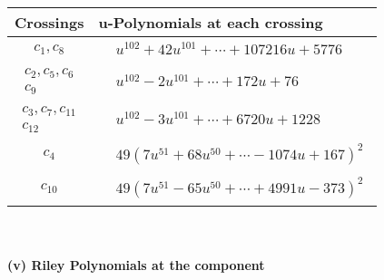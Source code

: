 \documentclass[1p]{elsarticle_modified}
\theoremstyle{definition}
\begin{document}
\begin{tabular}{m{50pt}|m{274pt}}
Crossings & \hspace{64pt}u-Polynomials at each crossing \\
\hline $$\begin{aligned}c_{1},c_{8}\end{aligned}$$&$\begin{aligned}
&u^{102}+42 u^{101}+\cdots+107216 u+5776
\end{aligned}$\\
\hline $$\begin{aligned}c_{2},c_{5},c_{6}\\c_{9}\end{aligned}$$&$\begin{aligned}
&u^{102}-2 u^{101}+\cdots+172 u+76
\end{aligned}$\\
\hline $$\begin{aligned}c_{3},c_{7},c_{11}\\c_{12}\end{aligned}$$&$\begin{aligned}
&u^{102}-3 u^{101}+\cdots+6720 u+1228
\end{aligned}$\\
\hline $$\begin{aligned}c_{4}\end{aligned}$$&$\begin{aligned}
&49(7 u^{51}+68 u^{50}+\cdots-1074 u+167)^{2}
\end{aligned}$\\
\hline $$\begin{aligned}c_{10}\end{aligned}$$&$\begin{aligned}
&49(7 u^{51}-65 u^{50}+\cdots+4991 u-373)^{2}
\end{aligned}$\\
\hline
\end{tabular}\\~\\
\newpage\renewcommand{\arraystretch}{1}
\flushleft \textbf{(v) Riley Polynomials at the component}\newline \\
\end{document}
